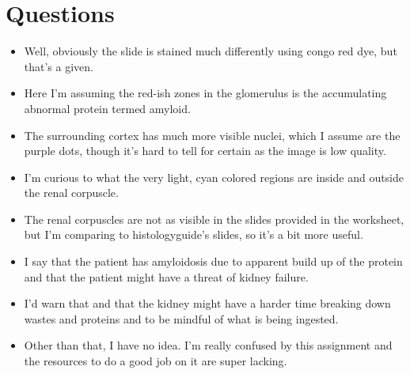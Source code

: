 \documentclass[basic]{inVerba-notes}
\begin{document}
\newpage
\section{Questions}
\begin{itemize}
  \begin{itemize}
    \item Well, obviously the slide is stained much differently using congo red dye, but that's a given.
    \item Here I'm assuming the red-ish zones in the glomerulus is the accumulating abnormal protein termed amyloid.
    \item The surrounding cortex has much more visible nuclei, which I assume are the purple dots, though it's hard to tell for certain as the image is low quality.
    \item I'm curious to what the very light, cyan colored regions are inside and outside the renal corpuscle. 
    \item The renal corpuscles are not as visible in the slides provided in the worksheet, but I'm comparing to histologyguide's slides, so it's a bit more useful. 
  \end{itemize}
  \begin{itemize}
    \item I say that the patient has amyloidosis due to apparent build up of the protein and that the patient might have a threat of kidney failure.
    \item I'd warn that and that the kidney might have a harder time breaking down wastes and proteins and to be mindful of what is being ingested.
    \item Other than that, I have no idea. I'm really confused by this assignment and the resources to do a good job on it are super lacking. 
  \end{itemize}
\end{itemize}
\end{document}
